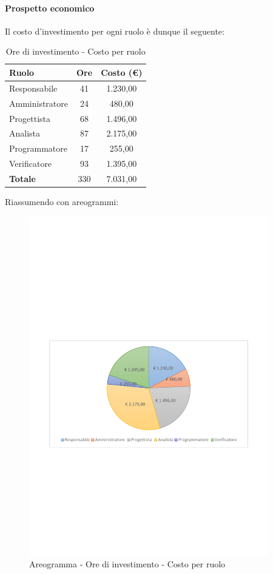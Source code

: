\documentclass[../PianoProgetto.tex]{subfiles}
\begin{document}
	\paragraph{Prospetto economico}
					Il costo d'investimento per ogni ruolo è dunque il seguente:
	\begin{table}[h]
		\centering
		\begin{tabular}{l * {2}{c}}
			\toprule
			\textbf{Ruolo} & \textbf{Ore} & \textbf{Costo (\euro{})} \\
			\midrule
			Responsabile &	41 &  1.230,00 \\
			Amministratore & 24 & 480,00 \\
			Progettista & 68 & 1.496,00 \\
			Analista & 87 & 2.175,00 \\
			Programmatore & 17 & 255,00 \\
			Verificatore & 93 & 1.395,00 \\
			\midrule		
			\textbf{Totale} & 330 & 7.031,00 \\
			\bottomrule
		\end{tabular}
		\caption{Ore di investimento - Costo per ruolo}
		\label{tab:investimento_costo}
	\end{table}
\vfill	
	Riassumendo con areogrammi:

	\begin{figure}[!h]
		\centering
		\includegraphics[width=0.93\textwidth , trim=2cm 9.5cm 2cm 11cm]{grafici/Riepilogo/Investimento/costo}
			\caption{Areogramma - Ore di investimento - Costo per ruolo}
		\label{fig:CircleChart-investimento_costo}
	\end{figure}
\vfill	
\newpage
\end{document}
